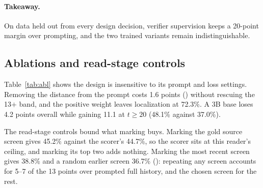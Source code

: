 \paragraph{Takeaway.} On data held out from every design decision, verifier supervision keeps a 20-point margin over prompting, and the two trained variants remain indistinguishable.

\subsection{Ablations and read-stage controls}
\label{sec:ablation}
\begin{table}[t]
\centering\footnotesize\setlength{\tabcolsep}{4pt}
\caption{Left: scorer ablations, localization (\%) on 188 cases, $p$ against the full scorer. Right: read-stage controls, end-to-end (\%) on the same cases, $p$ against marking the scorer's choice.}
\label{tab:abl}
\end{table}

Table~\ref{tab:abl} shows the design is insensitive to its prompt and loss settings. Removing the distance from the prompt costs 1.6 points () without rescuing the 13$+$ band, and the positive weight leaves localization at 72.3\%. A 3B base loses 4.2 points overall while gaining 11.1 at $t\ge20$ (48.1\% against 37.0\%).

The read-stage controls bound what marking buys. Marking the gold source screen gives 45.2\% against the scorer's 44.7\%, so the scorer sits at this reader's ceiling, and marking its top two adds nothing. Marking the most recent screen gives 38.8\% and a random earlier screen 36.7\% (): repeating any screen accounts for 5--7 of the 13 points over prompted full history, and the chosen screen for the rest.


